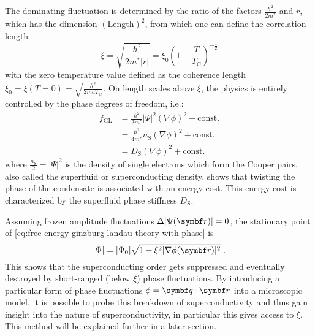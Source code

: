 \documentclass[../main.tex]{subfiles}
\begin{document}
The dominating fluctuation is determined by the ratio of the factors \(\frac{\hbar^2}{2m^*}\) and \(r\), which has the dimension \((\mathrm{Length})^2\), from which one can define the correlation length \cite{colemanIntroductionManyBodyPhysics2015}
\begin{equation}
	\xi = \sqrt{\frac{\hbar^2}{2m^* \vert r \vert}} = \xi_0 \left(1 - \frac{T}{T_{\mathrm{C}}}\right)^{-\frac{1}{2}}
	\label{eq:correlation length GL theory}
\end{equation}
with the zero temperature value defined as the coherence length \(\xi_0 = \xi(T=0) = \sqrt{\frac{\hbar^2}{2 m a T_{\mathrm{C}}}}\).
On length scales above \(\xi\), the physics is entirely controlled by the phase degrees of freedom, i.e.:
\begin{align}
	f_{\mathrm{GL}} &= \frac{\hbar^2}{2 m^*} \vert \Psi \vert^2 \left(\nabla \phi\right)^2 + \mathrm{const.} \nonumber \\
	&= \frac{\hbar^2}{4 m^*} n_{\mathrm{S}} \left(\nabla \phi\right)^2 + \mathrm{const.} \label{eq:GL energy above correlation length} \\
	&= D_{\mathrm{S}} \left(\nabla \phi\right)^2 + \mathrm{const.} \nonumber 
\end{align}
where \(\frac{n_{\mathrm{S}}}{2} = \vert \Psi \vert^2\) is the density of single electrons which form the Cooper pairs, also called the superfluid or superconducting density.
 shows that twisting the phase of the condensate is associated with an energy cost.
This energy cost is characterized by the superfluid phase stiffness \(D_{\mathrm{S}}\).

Assuming frozen amplitude fluctuations \(\adif{\vert \Psi (\vb{r}) \vert} = 0\), the stationary point of \cref{eq:free energy ginzburg-landau theory with phase} is
\begin{equation}
	\vert \Psi \vert = \vert \Psi_0 \vert \sqrt{1 - \xi^2 \vert \nabla \phi (\vb{r}) \vert^2} \;.
	\label{eq:breakdown of OP with phase fluctuations}
\end{equation}
This shows that the superconducting order gets suppressed and eventually destroyed by short-ranged (below \(\xi\)) phase fluctuations.
By introducing a particular form of phase fluctuations \(\phi = \vb{q} \cdot \vb{r}\) into a microscopic model, it is possible to probe this breakdown of superconductivity and thus gain insight into the nature of superconductivity, in particular this gives access to \(\xi\).
This method will be explained further in a later section.
\end{document}
